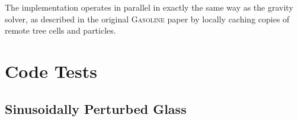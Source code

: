 \documentclass[fleq,usenatbib]{mnras}
\begin{document}
{The implementation operates in parallel in exactly the same way
as the gravity solver, as described in the original \textsc{Gasoline} paper by locally
caching copies of remote tree cells and particles.


\section{Code Tests}\label{sec:tsts}
\subsection{Sinusoidally Perturbed Glass}\label{sinusoidtest}
}
\end{document}
